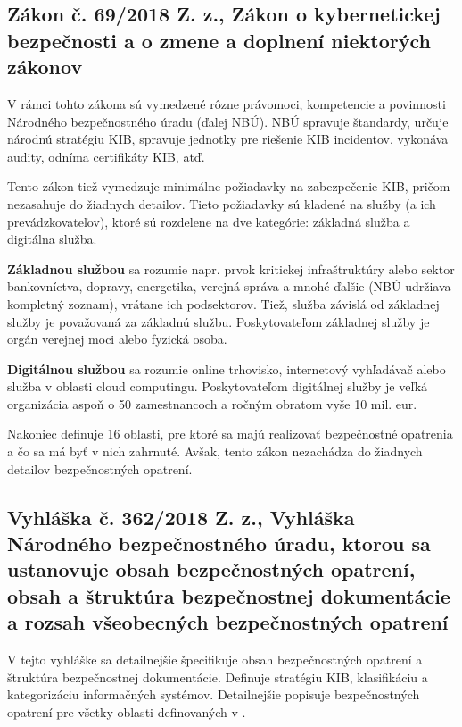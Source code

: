 \subsection{Zákon č. 69/2018 Z. z., Zákon o kybernetickej bezpečnosti a o zmene a doplnení niektorých zákonov \cite{69/2018}}

V rámci tohto zákona sú vymedzené rôzne právomoci, kompetencie a povinnosti Národného bezpečnostného úradu (ďalej NBÚ). NBÚ spravuje
štandardy, určuje národnú stratégiu KIB, spravuje jednotky pre riešenie KIB incidentov, vykonáva audity, odníma certifikáty KIB, atď.

Tento zákon tiež vymedzuje minimálne požiadavky na zabezpečenie KIB, pričom nezasahuje do žiadnych detailov. 
Tieto požiadavky sú kladené na služby (a ich prevádzkovateľov), ktoré sú rozdelene na dve kategórie: základná služba a digitálna služba.

\textbf{Základnou službou} sa rozumie napr. prvok kritickej infraštruktúry alebo sektor bankovníctva, dopravy, energetika, verejná správa a
mnohé ďalšie (NBÚ udržiava kompletný zoznam), vrátane ich podsektorov. Tiež, služba závislá od základnej služby je považovaná za základnú službu.
Poskytovateľom základnej služby je orgán verejnej moci alebo fyzická osoba.

\textbf{Digitálnou službou} sa rozumie online trhovisko, internetový vyhľadávač alebo služba v oblasti cloud computingu. 
Poskytovateľom digitálnej služby je veľká organizácia aspoň o 50 zamestnancoch a ročným obratom vyše 10 mil. eur.

Nakoniec definuje 16 oblasti, pre ktoré sa majú realizovať bezpečnostné opatrenia a čo sa má byť v nich zahrnuté. 
Avšak, tento zákon nezachádza do žiadnych detailov bezpečnostných opatrení.   

\subsection{Vyhláška č. 362/2018 Z. z., Vyhláška Národného bezpečnostného úradu, ktorou sa ustanovuje obsah bezpečnostných opatrení, obsah a štruktúra
bezpečnostnej dokumentácie a rozsah všeobecných bezpečnostných opatrení \cite{362/2018}}

V tejto vyhláške sa detailnejšie špecifikuje obsah bezpečnostných opatrení a štruktúra bezpečnostnej dokumentácie.
Definuje stratégiu KIB, klasifikáciu a kategorizáciu informačných systémov. Detailnejšie popisuje bezpečnostných opatrení
pre všetky oblasti definovaných v \cite{69/2018}. 

